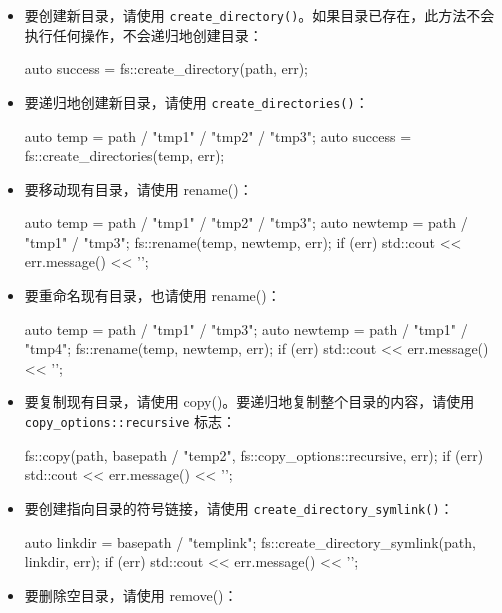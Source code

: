 \begin{itemize}
\item
要创建新目录，请使用 \verb|create_directory()|。如果目录已存在，此方法不会执行任何操作，不会递归地创建目录：

\begin{cpp}
auto success = fs::create_directory(path, err);
\end{cpp}

\item
要递归地创建新目录，请使用 \verb|create_directories()|：

\begin{cpp}
auto temp = path / "tmp1" / "tmp2" / "tmp3";
auto success = fs::create_directories(temp, err);
\end{cpp}

\item
要移动现有目录，请使用 rename()：

\begin{cpp}
auto temp = path / "tmp1" / "tmp2" / "tmp3";
auto newtemp = path / "tmp1" / "tmp3";
fs::rename(temp, newtemp, err);
if (err) std::cout << err.message() << '\n';
\end{cpp}

\item
要重命名现有目录，也请使用 rename()：

\begin{cpp}
auto temp = path / "tmp1" / "tmp3";
auto newtemp = path / "tmp1" / "tmp4";
fs::rename(temp, newtemp, err);
if (err) std::cout << err.message() << '\n';
\end{cpp}

\item
要复制现有目录，请使用 copy()。要递归地复制整个目录的内容，请使用 \verb|copy_options::recursive| 标志：

\begin{cpp}
fs::copy(path, basepath / "temp2",
         fs::copy_options::recursive, err);
if (err) std::cout << err.message() << '\n';
\end{cpp}

\item
要创建指向目录的符号链接，请使用 \verb|create_directory_symlink()|：

\begin{cpp}
auto linkdir = basepath / "templink";
fs::create_directory_symlink(path, linkdir, err);
if (err) std::cout << err.message() << '\n';
\end{cpp}

\item
要删除空目录，请使用 remove()：


\end{itemize}
